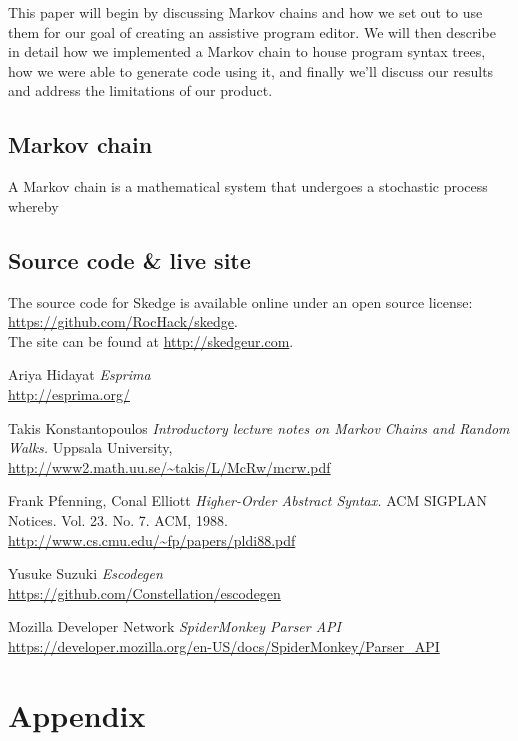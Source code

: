 \documentclass[titlepage]{article}
\begin{document}
This paper\cite{escodegen} will begin by discussing Markov chains and how we set out to use them for our goal of creating an assistive program editor. We will then describe in detail how we implemented a Markov chain to house program syntax trees, how we were able to generate code using it, and finally we'll discuss our results and address the limitations of our product.

\subsection{Markov chain}

A Markov chain is a mathematical system that undergoes a stochastic process whereby


\subsection*{Source code \& live site}

The source code for Skedge is available online under an open
source license:
\url{https://github.com/RocHack/skedge}.\\

\noindent The site can be found at
\url{http://skedgeur.com}.

\clearpage

\begin{thebibliography}{1}

	 Ariya Hidayat {\em Esprima}
		\\\url{http://esprima.org/}

	 Takis Konstantopoulos {\em Introductory lecture notes on
		Markov Chains and Random Walks.} Uppsala University,
		\\\url{http://www2.math.uu.se/~takis/L/McRw/mcrw.pdf}

	 Frank Pfenning, Conal Elliott
		{\em Higher-Order Abstract Syntax.}
		ACM SIGPLAN Notices. Vol. 23. No. 7. ACM, 1988.
		\\\url{http://www.cs.cmu.edu/~fp/papers/pldi88.pdf}

	 Yusuke Suzuki {\em Escodegen}
		\\\url{https://github.com/Constellation/escodegen}

	 Mozilla Developer Network {\em SpiderMonkey Parser API}
		\\\url{https://developer.mozilla.org/en-US/docs/SpiderMonkey/Parser_API}

\end{thebibliography}

\clearpage
\section*{Appendix}
\end{document}
